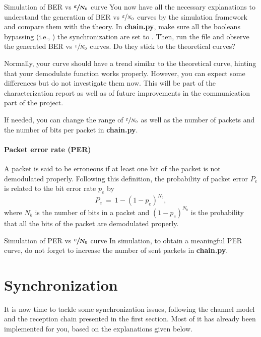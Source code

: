 \begin{bclogo}[couleur = gray!20, arrondi = 0.2, logo=\bccrayon]{Simulation of BER vs $\boldsymbol{\sfrac{\varepsilon}{N_0}}$ curve}
You now have all the necessary explanations to understand the generation of BER vs $\sfrac{\varepsilon}{N_0}$ curves by the simulation framework and compare them with the theory. In \textbf{chain.py}, make sure all the booleans bypassing (i.e., ) the synchronization are set to . Then, run the file and observe the generated BER vs $\sfrac{\varepsilon}{N_0}$ curves. Do they stick to the theoretical curves?

Normally, your curve should have a trend similar to the theoretical curve, hinting that your demodulate function works properly. However, you can expect some differences but do not investigate them now. This will be part of the characterization report as well as of future improvements in the communication part of the project.

If needed, you can change the range of $\sfrac{\varepsilon}{N_0}$ as well as the number of packets and the number of bits per packet in \textbf{chain.py}.
\end{bclogo}
\paragraph{Packet error rate (PER)} A packet is said to be erroneous if at least one bit of the packet is not demodulated properly. Following this definition, the probability of packet error $P_e$ is related to the bit error rate $p_e$ by
\begin{equation*}
    P_e\:=\:1- (1-p_e)^{N_b},
\end{equation*}
where $N_b$ is the number of bits in a packet and $(1-p_e)^{N_b}$ is the probability that all the bits of the packet are demodulated properly.
\begin{bclogo}[couleur = gray!20, arrondi = 0.2, logo=\bccrayon]{Simulation of PER vs $\boldsymbol{\sfrac{\varepsilon}{N_0}}$ curve}
In simulation, to obtain a meaningful PER curve, do not forget to increase the number of sent packets in \textbf{chain.py}.
\end{bclogo}



\section{Synchronization}
It is now time to tackle some synchronization issues, following the channel model and the reception chain presented in the first section. Most of it has already been implemented for you, based on the explanations given below.

